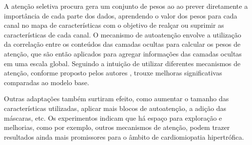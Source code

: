 A atenção seletiva procura gera um conjunto de pesos ao ao prever diretamente a importância de cada parte dos dados, aprendendo o valor dos pesos para cada canal no mapa de características com o objetivo de realçar ou suprimir as características de cada canal. O mecanismo de autoatenção envolve a utilização da correlação entre os conteúdos das camadas ocultas para calcular os pesos de atenção, que são então aplicados para agregar informações das camadas ocultas em uma escala global. Seguindo a intuição de utilizar diferentes mecanismos de atenção, conforme proposto pelos autores \cite{yangNeuralNetworkDesign2024a}, trouxe melhoras significativas comparadas ao modelo base. 

Outras adaptações também surtiram efeito, como aumentar o tamanho das características utilizadas, aplicar mais blocos de autoatenção, a adição das máscaras, etc. Os experimentos indicam que há espaço para exploração e melhorias, como por exemplo, outros mecanismos de atenção, podem trazer resultados ainda mais promissores para o âmbito de cardiomiopatia hipertrófica. 

